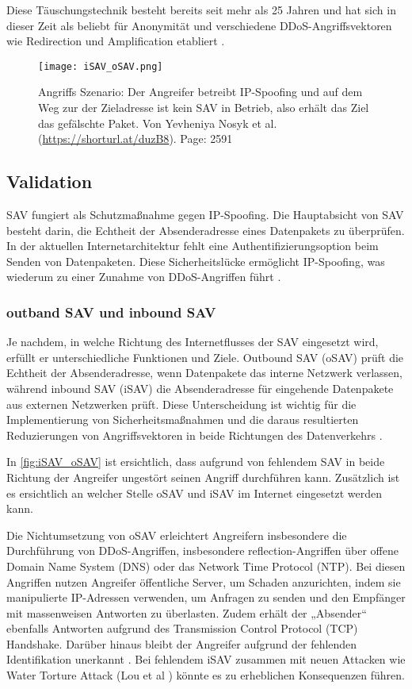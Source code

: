 \documentclass[sigplan,screen]{acmart}
\begin{document}
Diese Täuschungstechnik besteht bereits seit mehr als 25 Jahren und hat sich in dieser Zeit als beliebt für Anonymität und verschiedene DDoS-Angriffsvektoren wie Redirection und Amplification etabliert \cite{manrs01}.

\begin{figure}[h]
  \centering
  \texttt{[image: iSAV\_oSAV.png]}
  \caption{Angriffs Szenario:  Der Angreifer betreibt IP-Spoofing und auf dem Weg zur der Zieladresse ist kein SAV in Betrieb, also erhält das Ziel das gefälschte Paket. Von Yevheniya Nosyk et al. (\url{https://shorturl.at/duzB8}). Page: 2591}
  \label{fig:iSAV_oSAV}
\end{figure}

\subsection{Validation}
SAV fungiert als Schutzmaßnahme gegen IP-Spoofing. Die Hauptabsicht von SAV besteht darin, die Echtheit der Absenderadresse eines Datenpakets zu überprüfen. In der aktuellen Internetarchitektur fehlt eine Authentifizierungsoption beim Senden von Datenpaketen. Diese Sicherheitslücke ermöglicht IP-Spoofing, was wiederum zu einer Zunahme von DDoS-Angriffen führt \cite{Hal01}.

\subsubsection{outband SAV und inbound SAV}
Je nachdem, in welche Richtung des Internetflusses der SAV eingesetzt wird, erfüllt er unterschiedliche Funktionen und Ziele. Outbound SAV (oSAV) prüft die Echtheit der Absenderadresse, wenn Datenpakete das interne Netzwerk verlassen, während inbound SAV (iSAV) die Absenderadresse für eingehende Datenpakete aus externen Netzwerken prüft. Diese Unterscheidung ist wichtig für die Implementierung von Sicherheitsmaßnahmen und die daraus resultierten Reduzierungen von Angriffsvektoren in beide Richtungen des Datenverkehrs \cite{Hal01}. 

In \autoref{fig:iSAV_oSAV} ist ersichtlich, dass aufgrund von fehlendem SAV in beide Richtung der Angreifer ungestört seinen Angriff durchführen kann. Zusätzlich ist es ersichtlich an welcher Stelle oSAV und iSAV im Internet eingesetzt werden kann.

Die Nichtumsetzung von oSAV erleichtert Angreifern insbesondere die Durchführung von DDoS-Angriffen, insbesondere reflection-Angriffen über offene Domain Name System (DNS) oder das Network Time Protocol (NTP). Bei diesen Angriffen nutzen Angreifer öffentliche Server, um Schaden anzurichten, indem sie manipulierte IP-Adressen verwenden, um Anfragen zu senden und den Empfänger mit massenweisen Antworten zu überlasten. Zudem erhält der „Absender“ ebenfalls Antworten aufgrund des Transmission Control Protocol (TCP) Handshake. Darüber hinaus bleibt der Angreifer aufgrund der fehlenden Identifikation unerkannt \cite{manrs01} \cite{Hal01} \cite{Ingress01}. Bei fehlendem iSAV zusammen mit neuen Attacken wie Water Torture Attack (Lou et al \cite{Lou01}) könnte es zu erheblichen Konsequenzen führen.
\end{document}

